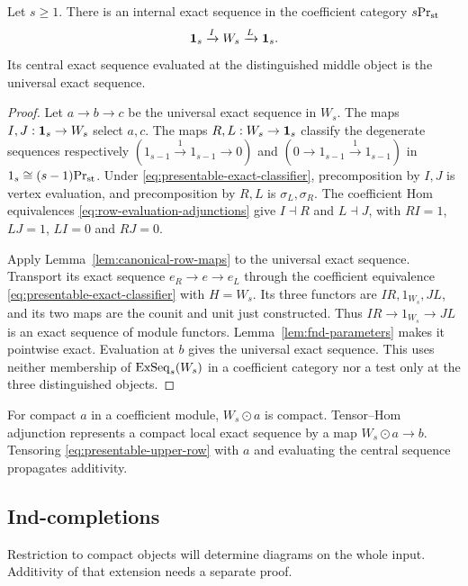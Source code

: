 \begin{proposition}\label{prop:fnd-upper}
Let \(s\ge1\).
There is an internal exact sequence in the coefficient
category ${s}\mathrm{Pr}_{\mathrm{st}}$
\begin{equation}\label{eq:presentable-upper-row}
 \mathbf 1_s\xrightarrow{I}W_s\xrightarrow{L}\mathbf 1_s.
\end{equation}
Its central exact sequence evaluated at the distinguished middle object is
the universal exact sequence.
\end{proposition}

\begin{proof}
Let $a\to b\to c$ be the universal exact sequence in \(W_s\).
The maps $I,J:\mathbf 1_s\to W_s$ select $a,c$. The maps
$R,L:W_s\to\mathbf 1_s$ classify the degenerate sequences respectively $(1_{s-1}\xrightarrow11_{s-1}\to0)$ and
$(0\to 1_{s-1}\xrightarrow11_{s-1})$ in \(1_s\cong {(s-1)}\mathrm{Pr}_{\mathrm{st}}\). Under
\eqref{eq:presentable-exact-classifier}, precomposition by $I,J$
is vertex evaluation, and precomposition by $R,L$ is
$\sigma_L,\sigma_R$. The coefficient Hom equivalences
\eqref{eq:row-evaluation-adjunctions} give $I\dashv R$ and
$L\dashv J$, with $RI=1$, $LJ=1$, $LI=0$ and $RJ=0$.

Apply Lemma~\ref{lem:canonical-row-maps} to the universal exact sequence.
Transport its exact sequence $e_R\to e\to e_L$ through the
coefficient equivalence \eqref{eq:presentable-exact-classifier}
with $H=W_s$. Its three functors are $IR,1_{W_s},JL$,
and its two maps are the counit and unit just constructed.
Thus $IR\to1_{W_s}\to JL$ is an exact sequence of module
functors. Lemma~\ref{lem:fnd-parameters} makes it pointwise exact.
Evaluation at $b$ gives the universal exact sequence. This uses neither
membership of $\operatorname{ExSeq}_s(W_s)$ in a coefficient category nor a
test only at the three distinguished objects.
\end{proof}

For compact $a$ in a coefficient module, $W_s\odot a$ is compact.
Tensor--Hom adjunction represents a compact local exact sequence by a
map $W_s\odot a\to b$. Tensoring
\eqref{eq:presentable-upper-row} with $a$ and evaluating the central
sequence propagates additivity.

\subsection{Ind-completions}
Restriction to compact objects will determine diagrams on the whole
input. Additivity of that extension needs a separate proof.

